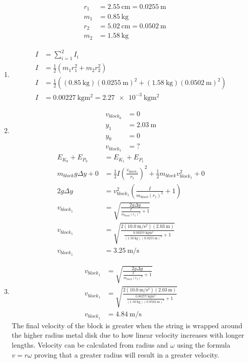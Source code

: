 \documentclass{article}
\begin{document}
\begin{align*}
	r_1 & = \SI{2.55}{\centi \meter} = \SI{0.0255}{\meter} \\
	m_1 & = \SI{0.85}{\kilogram} \\
	r_2 & = \SI{5.02}{\centi \meter} = \SI{0.0502}{\meter} \\
	m_2 & = \SI{1.58}{\kilogram}
\end{align*}
\begin{enumerate}[label = \boldalpha]
	\item
		\begin{align*}
			I & = \sum_{i = 1}^{2} I_i \\
			I & = \frac{1}{2}(m_1r_1^2 + m_2r_2^2) \\
			I & = \frac{1}{2}((\SI{0.85}{\kilogram})(\SI{0.0255}{\meter})^2 + (\SI{1.58}{\kilogram})(\SI{0.0502}{\meter})^2) \\
			I & = \SI{0.00227}{\kilogram \meter \squared} = \SI{2.27e-3}{\kilogram \meter \squared}
		\end{align*}
	\item
		\begin{align*}
			v_{block_0} & = 0 \\
			y_1 & = \SI{2.03}{\meter} \\
			y_0 & = 0 \\
			v_{block_1} & = ?
		\end{align*}
		\begin{align*}
			E_{K_0} + E_{P_0} & = E_{K_1} + E_{P_1} \\
			m_{block}g\Delta y + 0 & = \frac{1}{2}I \left( \frac{v_{block_1}}{r_1} \right)^2 + \frac{1}{2}m_{block}v_{block_1}^2 + 0 \\
			2g\Delta y & = v_{block_1}^2 \left( \frac{ I }{ m_{block}(r_1)^2 } + 1 \right) \\
			v_{block_1} & = \sqrt{ \frac{ 2g\Delta y }{ \frac{ I }{ m_{block}(r_1)^2 } + 1 } } \\
			v_{block_1} & = \sqrt{ \frac{ 2(\SI{10.0}{\meter \per \second \squared})(\SI{2.03}{\meter}) }{ \frac{ \SI{0.00277}{\kilogram \meter \squared} }{ (\SI{1.50}{\kilogram})(\SI{0.0255}{\meter})^2 } + 1 } } \\
			v_{block_1} & = \SI{3.25}{\meter \per \second}
		\end{align*}
	\item
		\begin{align*}
			v_{block_1} & = \sqrt{ \frac{ 2g\Delta y }{ \frac{ I }{ m_{block}(r_2)^2 } + 1 } } \\
			v_{block_1} & = \sqrt{ \frac{ 2(\SI{10.0}{\meter \per \second \squared})(\SI{2.03}{\meter}) }{ \frac{ \SI{0.00277}{\kilogram \meter \squared} }{ (\SI{1.50}{\kilogram})(\SI{0.0502}{\meter})^2 } + 1 } } \\
			v_{block_1} & = \SI{4.84}{\meter \per \second}
		\end{align*}
		The final velocity of the block is greater when the string is wrapped around the higher radius metal disk due to how linear velocity increases with longer lengths. Velocity can be calculated from radius and $ \omega $ using the formula $ v = r\omega $ proving that a greater radius will result in a greater velocity.
\end{enumerate}
\end{document}
